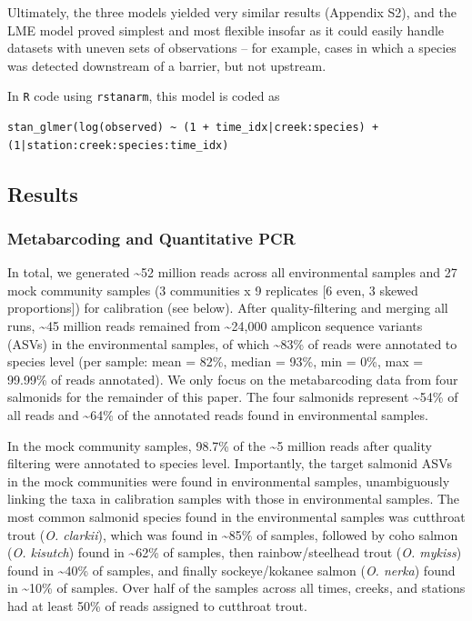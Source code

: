 \documentclass[
]{article}
\begin{document}
Ultimately, the three models yielded very similar results (Appendix S2),
and the LME model proved simplest and most flexible insofar as it could
easily handle datasets with uneven sets of observations -- for example,
cases in which a species was detected downstream of a barrier, but not
upstream.

In \texttt{R} code using \texttt{rstanarm}, this model is coded as

\begin{verbatim}
stan_glmer(log(observed) ~ (1 + time_idx|creek:species) + (1|station:creek:species:time_idx)  
\end{verbatim}

\hypertarget{results}{%
\subsection{Results}\label{results}}

\hypertarget{metabarcoding-and-quantitative-pcr}{%
\subsubsection{Metabarcoding and Quantitative
PCR}\label{metabarcoding-and-quantitative-pcr}}

In total, we generated \textasciitilde52 million reads across all
environmental samples and 27 mock community samples (3 communities x 9
replicates {[}6 even, 3 skewed proportions{]}) for calibration (see
below). After quality-filtering and merging all runs, \textasciitilde45
million reads remained from \textasciitilde24,000 amplicon sequence
variants (ASVs) in the environmental samples, of which
\textasciitilde83\% of reads were annotated to species level (per
sample: mean = 82\%, median = 93\%, min = 0\%, max = 99.99\% of reads
annotated). We only focus on the metabarcoding data from four salmonids
for the remainder of this paper. The four salmonids represent
\textasciitilde54\% of all reads and \textasciitilde64\% of the
annotated reads found in environmental samples.

In the mock community samples, 98.7\% of the \textasciitilde5 million
reads after quality filtering were annotated to species level.
Importantly, the target salmonid ASVs in the mock communities were found
in environmental samples, unambiguously linking the taxa in calibration
samples with those in environmental samples. The most common salmonid
species found in the environmental samples was cutthroat trout (\emph{O.
clarkii}), which was found in \textasciitilde85\% of samples, followed
by coho salmon (\emph{O. kisutch}) found in \textasciitilde62\% of
samples, then rainbow/steelhead trout (\emph{O. mykiss}) found in
\textasciitilde40\% of samples, and finally sockeye/kokanee salmon
(\emph{O. nerka}) found in \textasciitilde10\% of samples. Over half of
the samples across all times, creeks, and stations had at least 50\% of
reads assigned to cutthroat trout.
\end{document}
